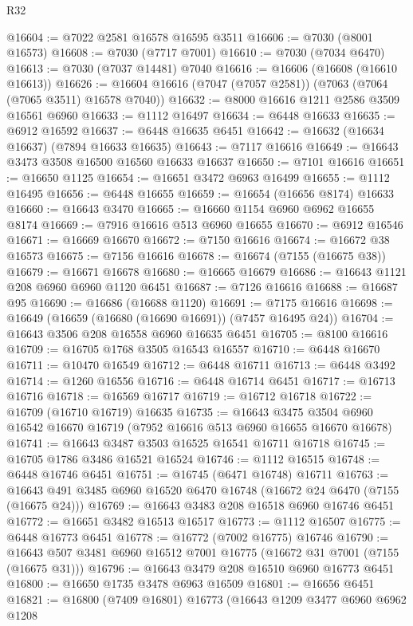 \begin{lexlean}{R32}
\begin{coremodule}
@16604 := @7022 @2581 @16578 @16595 @3511
@16606 := @7030 (@8001 @16573)
@16608 := @7030 (@7717 @7001)
@16610 := @7030 (@7034 @6470)
@16613 := @7030 (@7037 @14481) @7040
@16616 := @16606 (@16608 (@16610 @16613))
@16626 := @16604 @16616 (@7047 (@7057 @2581)) (@7063 (@7064 (@7065 @3511) @16578 @7040))
@16632 := @8000 @16616 @1211 @2586 @3509 @16561 @6960
@16633 := @1112 @16497
@16634 := @6448 @16633
@16635 := @6912 @16592
@16637 := @6448 @16635 @6451
@16642 := @16632 (@16634 @16637) (@7894 @16633 @16635)
@16643 := @7117 @16616
@16649 := @16643 @3473 @3508 @16500 @16560 @16633 @16637
@16650 := @7101 @16616
@16651 := @16650 @1125
@16654 := @16651 @3472 @6963 @16499
@16655 := @1112 @16495
@16656 := @6448 @16655
@16659 := @16654 (@16656 @8174) @16633
@16660 := @16643 @3470
@16665 := @16660 @1154 @6960 @6962 @16655 @8174
@16669 := @7916 @16616 @513 @6960 @16655
@16670 := @6912 @16546
@16671 := @16669 @16670
@16672 := @7150 @16616
@16674 := @16672 @38 @16573
@16675 := @7156 @16616
@16678 := @16674 (@7155 (@16675 @38))
@16679 := @16671 @16678
@16680 := @16665 @16679
@16686 := @16643 @1121 @208 @6960 @6960 @1120 @6451
@16687 := @7126 @16616
@16688 := @16687 @95
@16690 := @16686 (@16688 @1120)
@16691 := @7175 @16616
@16698 := @16649 (@16659 (@16680 (@16690 @16691)) (@7457 @16495 @24))
@16704 := @16643 @3506 @208 @16558 @6960 @16635 @6451
@16705 := @8100 @16616
@16709 := @16705 @1768 @3505 @16543 @16557
@16710 := @6448 @16670
@16711 := @10470 @16549
@16712 := @6448 @16711
@16713 := @6448 @3492
@16714 := @1260 @16556
@16716 := @6448 @16714 @6451
@16717 := @16713 @16716
@16718 := @16569 @16717
@16719 := @16712 @16718
@16722 := @16709 (@16710 @16719) @16635
@16735 := @16643
    @3475
    @3504
    @6960
    @16542
    @16670
    @16719
    (@7952 @16616 @513 @6960 @16655 @16670 @16678)
@16741 := @16643 @3487 @3503 @16525 @16541 @16711 @16718
@16745 := @16705 @1786 @3486 @16521 @16524
@16746 := @1112 @16515
@16748 := @6448 @16746 @6451
@16751 := @16745 (@6471 @16748) @16711
@16763 := @16643 @491 @3485 @6960 @16520 @6470 @16748 (@16672 @24 @6470 (@7155 (@16675 @24)))
@16769 := @16643 @3483 @208 @16518 @6960 @16746 @6451
@16772 := @16651 @3482 @16513 @16517
@16773 := @1112 @16507
@16775 := @6448 @16773 @6451
@16778 := @16772 (@7002 @16775) @16746
@16790 := @16643 @507 @3481 @6960 @16512 @7001 @16775 (@16672 @31 @7001 (@7155 (@16675 @31)))
@16796 := @16643 @3479 @208 @16510 @6960 @16773 @6451
@16800 := @16650 @1735 @3478 @6963 @16509
@16801 := @16656 @6451
@16821 := @16800
    (@7409 @16801)
    @16773
    (@16643
      @1209
      @3477
      @6960
      @6962
      @1208

\end{coremodule}
\end{lexlean}
